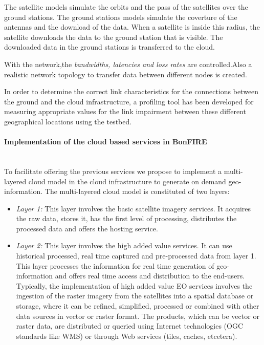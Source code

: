 The satellite models simulate the orbits and the pass of the satellites over the ground stations. The ground stations models simulate the coverture of the antennas and the download of the data. When a satellite is inside this radius, the satellite downloads the data to the ground station that is visible. The downloaded data in the ground stations is transferred to the \bonfire cloud.

With the \vw network,the \emph{bandwidths, latencies and loss rates} are
controlled.Also a realistic network topology to transfer data between different
nodes is created.

In order to determine the correct link characteristics for the connections
between the ground and the cloud infrastructure, a profiling tool has been
developed for measuring appropriate values for the link impairment between these different geographical locations using the \pl testbed.


\paragraph{Implementation of the cloud based services in BonFIRE}~\\
To facilitate offering the previous services we propose to implement a multi-layered cloud model in the \bonfire cloud infrastructure to generate on demand geo-information. The multi-layered cloud model is constituted of two layers:
\begin{itemize}
\item \emph{Layer 1:} This layer involves the basic satellite imagery services.  It acquires the raw data, stores it, has the first level of processing, distributes the processed data and offers the hosting service.

\item \emph{Layer 2:} This layer involves the high added value services. It can use historical processed, real time captured and pre-processed data from layer 1. This layer processes the information for real time generation of geo-information and offers real time access and distribution to the end-users. Typically, the implementation of high added value EO services involves the ingestion of the raster imagery from the satellites into a spatial database or storage, where it can be refined, simplified, processed or combined with other data sources in vector or raster format. The products, which can be vector or raster data, are distributed or queried using Internet technologies (\ac{OGC} standards like \ac{WMS}) or through Web services (tiles, caches, etcetera).
\end{itemize}

